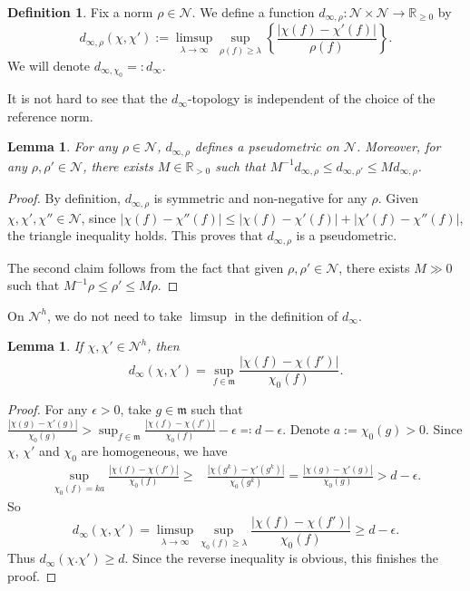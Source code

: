 \documentclass[11pt, leqno]{amsart}%
\theoremstyle{plain}
\newtheorem{lemma}[theorem]{Lemma}
\theoremstyle{definition}
\newtheorem{definition}[theorem]{Definition}
\theoremstyle{remark}
\newcommand{\cN}{\mathcal{N}}
\newcommand{\bR}{\mathbb{R}}
\newcommand{\bZ}{\mathbb{Z}}
\newcommand{\fm}{\mathfrak{m}}
\numberwithin{equation}{section}
\begin{document}
\begin{definition}\label{defn:d_infty metric}
    Fix a norm $\rho\in\cN$. We define a function $d_{\infty,\rho}:\cN\times\cN\to\bR_{\ge 0}$ by
    \[
        d_{\infty,\rho}(\chi,\chi'):=\limsup_{\lambda\to\infty}\sup_{\rho(f)\ge\lambda}\left\{\frac{|\chi(f)-\chi'(f)|}{\rho(f)}\right\}.
    \]
    We will denote $d_{\infty,\chi_0}=:d_\infty$.
\end{definition}


It is not hard to see that the $d_\infty$-topology is independent of the choice of the reference norm.

\begin{lemma}\label{lem:d_infty is p-metric}
    For any $\rho\in\cN$, $d_{\infty,\rho}$ defines a pseudometric on $\cN$. Moreover, for any $\rho,\rho'\in\cN$, there exists $M\in\bR_{>0}$ such that $M^{-1}d_{\infty,\rho}\le d_{\infty,\rho'}\le Md_{\infty,\rho}$. 
\end{lemma}

\begin{proof}
    By definition, $d_{\infty,\rho}$ is symmetric and non-negative for any $\rho$. Given $\chi,\chi',\chi''\in\cN$, since $|\chi(f)-\chi''(f)|\le |\chi(f)-\chi'(f)|+|\chi'(f)-\chi''(f)|$, the triangle inequality holds. This proves that $d_{\infty,\rho}$ is a pseudometric.
	
    The second claim follows from the fact that given $\rho,\rho'\in\cN$, there exists $M\gg 0$ such that $M^{-1}\rho\le \rho'\le M\rho$.
\end{proof}





On $\cN^h$, we do not need to take $\limsup$ in the definition of $d_\infty$.

\begin{lemma}\label{lem:d_infty for homogeneous}
    If $\chi,\chi'\in\cN^h$, then
    \[
        d_\infty(\chi,\chi')=\sup_{f\in\fm}\frac{|\chi(f)-\chi(f')|}{\chi_0(f)}.
    \]
\end{lemma}

\begin{proof}
    For any $\epsilon>0$, take $g\in\fm$ such that $\frac{|\chi(g)-\chi'(g)|}{\chi_0(g)}>\sup_{f\in\fm}\frac{|\chi(f)-\chi(f')|}{\chi_0(f)}-\epsilon\eqqcolon d-\epsilon$. Denote $a:=\chi_0(g)>0$. Since $\chi$, $\chi'$ and $\chi_0$ are homogeneous, we have
    \begin{align*}
        \sup_{\chi_0(f)=ka}\frac{|\chi(f)-\chi(f')|}{\chi_0(f)}
        \ge &\frac{|\chi(g^k)-\chi'(g^k)|}{\chi_0(g^k)}
        =\frac{|\chi(g)-\chi'(g)|}{\chi_0(g)}>d-\epsilon.
    \end{align*}
    So 
    \[
        d_\infty(\chi,\chi')=\limsup_{\lambda\to\infty} \sup_{\chi_0(f)\ge \lambda}\frac{|\chi(f)-\chi(f')|}{\chi_0(f)}\ge d-\epsilon.
    \]
    Thus $d_\infty(\chi.\chi')\ge d$. Since the reverse inequality is obvious, this finishes the proof.
\end{proof}
\end{document}
